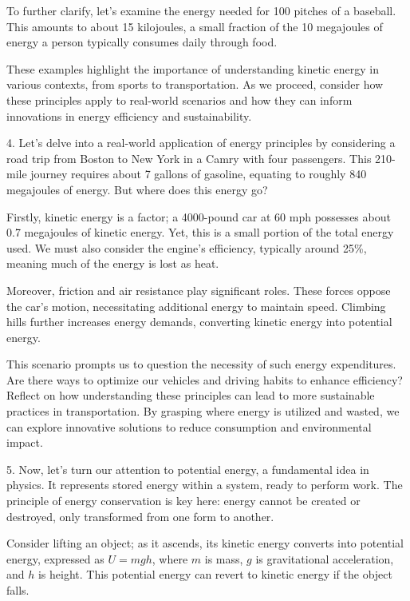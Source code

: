 \begin{tcolorbox}[size=title,opacityfill=0.05,breakable]
To further clarify, let's examine the energy needed for 100 pitches of a baseball. This amounts to about 15 kilojoules, a small fraction of the 10 megajoules of energy a person typically consumes daily through food.

These examples highlight the importance of understanding kinetic energy in various contexts, from sports to transportation. As we proceed, consider how these principles apply to real-world scenarios and how they can inform innovations in energy efficiency and sustainability.

4. Let's delve into a real-world application of energy principles by considering a road trip from Boston to New York in a Camry with four passengers. This 210-mile journey requires about 7 gallons of gasoline, equating to roughly 840 megajoules of energy. But where does this energy go?

Firstly, kinetic energy is a factor; a 4000-pound car at 60 mph possesses about 0.7 megajoules of kinetic energy. Yet, this is a small portion of the total energy used. We must also consider the engine's efficiency, typically around 25\%, meaning much of the energy is lost as heat.

Moreover, friction and air resistance play significant roles. These forces oppose the car's motion, necessitating additional energy to maintain speed. Climbing hills further increases energy demands, converting kinetic energy into potential energy.

This scenario prompts us to question the necessity of such energy expenditures. Are there ways to optimize our vehicles and driving habits to enhance efficiency? Reflect on how understanding these principles can lead to more sustainable practices in transportation. By grasping where energy is utilized and wasted, we can explore innovative solutions to reduce consumption and environmental impact.


5. Now, let's turn our attention to potential energy, a fundamental idea in physics. It represents stored energy within a system, ready to perform work. The principle of energy conservation is key here: energy cannot be created or destroyed, only transformed from one form to another.

Consider lifting an object; as it ascends, its kinetic energy converts into potential energy, expressed as \( U = mgh \), where \( m \) is mass, \( g \) is gravitational acceleration, and \( h \) is height. This potential energy can revert to kinetic energy if the object falls.


\end{tcolorbox}
